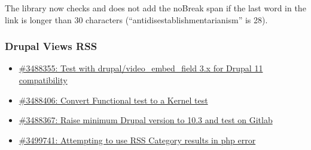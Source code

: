     The library now checks and does not add the noBreak span if the last word in the link is longer than 30 characters (``antidisestablishmentarianism'' is 28).

    \subsubsection{Drupal Views RSS}
    \begin{itemize}
        \item \href{https://www.drupal.org/project/views_rss/issues/3488355}{\#3488355: Test with drupal/video\_embed\_field 3.x for Drupal 11 compatibility}
        \item \href{https://www.drupal.org/project/views_rss/issues/3488406}{\#3488406: Convert Functional test to a Kernel test}
        \item \href{https://www.drupal.org/project/views_rss/issues/3488367}{\#3488367: Raise minimum Drupal version to 10.3 and test on Gitlab}
        \item \href{https://www.drupal.org/project/views_rss/issues/3499741}{\#3499741: Attempting to use RSS Category results in php error}
    \end{itemize}

